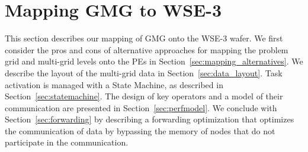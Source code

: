 \documentclass[sigconf]{acmart}
\begin{document}

            
\section{Mapping GMG to WSE-3}
This section describes our mapping of GMG onto the WSE-3 wafer.  We first consider the pros and cons of alternative approaches for mapping the problem grid and multi-grid levels onto the PEs in Section~\ref{sec:mapping_alternatives}. 
We describe the layout of the multi-grid data in Section~\ref{sec:data_layout}. %
Task activation is managed with a State Machine, as described in Section~\ref{sec:statemachine}.  The design of key operators and a model of their communication are presented in Section~\ref{sec:perfmodel}.  We conclude with Section~\ref{sec:forwarding} by describing a forwarding optimization that optimizes the communication of data by bypassing the memory of nodes that do not participate in the communication.
\end{document}
